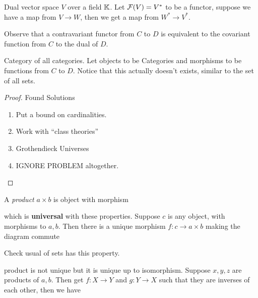 \begin{example}
	Dual vector space $V$ over a field $\mathbb K$. Let $
	\mathcal F(V) = V^*$ to be a functor, suppose we have a map from $V \to W$, then we get a map from $W^* \to V^*$. 
\end{example}
\begin{remark}
	Observe that a contravariant functor from $C$ to $D$ is equivalent to the covariant function from $C$ to the dual of $D$.
\end{remark}
\begin{example}
	Category of all categories. Let objects to be Categories and morphisms to be functions from $C$ to $D$. Notice that this actually doesn't exists, similar to the set of all sets.
\end{example}
\begin{proof}
	Found Solutions
	\begin{enumerate}
		\item Put a bound on cardinalities.
		\item Work with ``class theories''
		\item Grothendieck Universes
		\item IGNORE PROBLEM altogether.
	\end{enumerate}
\end{proof} 
\begin{definition}
	A \textit{product} $a \times b$ is object with morphism 
	\begin{center}
	\end{center}
	which is \textbf{universal} with these properties. Suppose $c$ is any object, with morphisms to $a,b$. Then there is a unique morphism $f : c \to a \times b$ making the diagram commute
	\begin{center}
	\end{center}
\end{definition}
\begin{exercise}
	Check usual of sets has this property.
\end{exercise}
\begin{remark}
	product is not unique but it is unique up to isomorphism. Suppose $x,y,z$ are products of $a,b$. Then get $f : X \to Y$ and $g : Y \to X$ such that they are inverses of each other, then we have
\end{remark}
